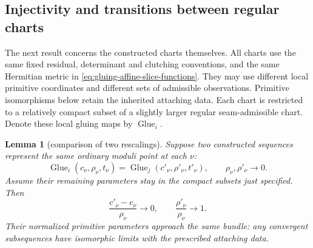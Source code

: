 \documentclass[11pt]{amsart}
\newtheorem{lemma}[theorem]{Lemma}
\theoremstyle{definition}
\theoremstyle{remark}
\theoremstyle{plain}
\newcommand{\Glue}{\operatorname{Glue}}
\begin{document}
\subsection{Injectivity and transitions between regular charts}

The next result concerns the constructed charts themselves.
All charts use the same fixed residual, determinant and
clutching conventions, and the same Hermitian metric in
\eqref{eq:gluing-affine-slice-functions}.
They may use different local primitive coordinates and
different sets of admissible observations. Primitive
isomorphisms below retain the inherited attaching data.
Each chart is restricted to a relatively compact subset
of a slightly larger regular seam-admissible chart.
Denote these local gluing maps by $\Glue_i$.

\begin{lemma}[comparison of two rescalings]
\label{lem:collar-two-rescalings}
Suppose two constructed sequences represent the same
ordinary moduli point at each $\nu$:
\[
 \Glue_i(c_\nu,\rho_\nu,t_\nu)
             =\Glue_j(c'_\nu,\rho'_\nu,t'_\nu),
              \qquad \rho_\nu,\rho'_\nu\longrightarrow0 .
\]
Assume their remaining parameters stay in the compact
subsets just specified. Then
\begin{equation}\label{eq:collar-relative-scales}
 \frac{c'_\nu-c_\nu}{\rho_\nu}\longrightarrow0,\qquad
 \frac{\rho'_\nu}{\rho_\nu}\longrightarrow1 .
\end{equation}
Their normalized primitive parameters approach the same
bundle: any convergent subsequences have isomorphic limits
with the prescribed attaching data.
\end{lemma}
\end{document}
